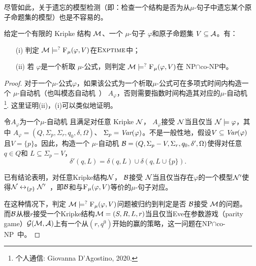 尽管如此，关于遗忘的模型检测（即：检查一个结构是否为从$\mu$-句子中遗忘某个原子命题集的模型）也是不容易的。
\begin{proposition}[模型检测]\label{chapter06:pro:MC}
	给定一个有限的 Kripke 结构  ${\cal M}$、一个 $\mu$-句子 $\varphi$和原子命题集 $V\subseteq {\cal A}$。有：
	\begin{itemize}
		\item[(i)] 判定 ${\cal M} \models^? {\textsc{F}_{\textsc{$\mu$}}}(\varphi, V)$在$\textsc{Exptime}$中；
		\item[(ii)] 若 $\varphi$是一个析取 $\mu$-公式，则判定 ${\cal M} \models^? {\textsc{F}_{\textsc{$\mu$}}}(\varphi, V)$在 \textsc{NP}$\cap$co-\textsc{NP}中。
	\end{itemize}
\end{proposition}
\begin{proof}
	对于一个$\mu$-公式$\varphi$，如果该公式为一个析取$\mu$-公式可在多项式时间内构造一个 $\mu$-自动机（也叫模态自动机~\cite{bradfield2018mu}） $A_{\varphi}$，否则需要指数时间构造其对应的$\mu$-自动机\footnote{个人通信: Giovanna D'Agostino, 2020.}.
	这里证明(ii)，(i)可以类似地证明。
	
	令$A_{\varphi}$为一个$\mu$-自动机 且满足对任意 Kripke ${\cal N}$， %
	$A_{\varphi}$接受 ${\cal N}$当且仅当 ${\cal N} \models \varphi$，其中 $A_{\varphi} = (Q, \Sigma_p, \Sigma_r, q_0, \delta, \Omega)$、 $\Sigma_p = \textit{Var}(\varphi)$。不是一般性地，假设$V \subseteq \textit{Var}(\varphi)$且$V=\{p\}$。因此，构造一个 $\mu$-自动机 ${\cal B}= (Q, \Sigma_p - V, \Sigma_r, q_0, \delta', \Omega)$使得对任意$q\in Q$和 $L\subseteq \Sigma_p - V$，
	\[
	\delta'(q, L) = \delta(q, L) \cup \delta(q, L \cup \{p\}).
	\]
	
	已有结论表明，对任意Kripke结构${\cal N}$， ${\cal B}$接受 ${\cal N}$当且仅当存在$\varphi$的一个模型${\cal N}'$使得${\cal N} \leftrightarrow_{\{p\}} {\cal N}'$~\cite{d1996uniform}，即${\cal B}$和与${\textsc{F}_{\textsc{$\mu$}}}(\varphi, V)$等价的$\mu$-句子对应。
	
	
	在这种情况下，判定 ${\cal M} \models^? {\textsc{F}_{\textsc{$\mu$}}}(\varphi, V)$问题被归约到判定是否 ${\cal B}$接受 ${\cal M}$的问题。
	而${\cal B}$从根$r$接受一个Kripke结构${\cal M}=(S, R,L, r)$当且仅当Eve在参数游戏（parity game）${\cal G}({\cal M}, {\cal A})$上有一个从$(r,q^0)$开始的赢的策略，这一问题在\textsc{NP}$\cap$co-\textsc{NP}~\cite{bradfield2018mu}中。
\end{proof}

